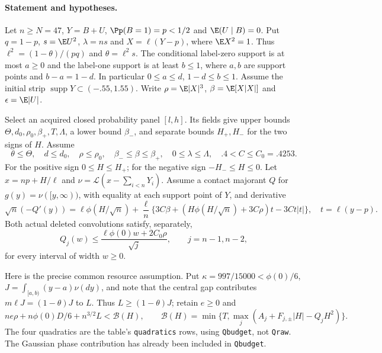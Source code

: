 \paragraph{Statement and hypotheses.}
Let $n\ge N=47$, $Y=B+U$, $\Pp(B=1)=p<1/2$ and $\E(U\mid B)=0$.
Put $q=1-p$, $s=\E U^2$, $\lambda=ns$ and $X=\ell(Y-p)$, where
$\E X^2=1$. Thus $\ell^2=(1-\theta)/(pq)$ and $\theta=\ell^2s$.
The conditional label-zero support is at most $a\ge0$ and the label-one
support is at least $b\le1$, where $a,b$ are support points and
$b-a=1-d$. In particular $0\le a\le d$, $1-d\le b\le1$.
Assume the initial strip $\operatorname{supp}Y\subset(-.55,1.55)$.
Write $\rho=\E|X|^3$, $\beta=\E[X|X|]$ and $\epsilon=\E|U|$.

Select an acquired closed probability panel $[l,h]$.
Its fields give upper bounds $\Theta,d_0,\rho_0,\beta_+,T,\Lambda$,
a lower bound $\beta_-$, and separate bounds $H_+,H_-$ for the two signs of
$H$. Assume
\[
 \theta\le\Theta,\quad d\le d_0,\quad \rho\le\rho_0,
 \quad \beta_-\le\beta\le\beta_+,\quad 0\le\lambda\le\Lambda,
 \quad .4<C\le C_0=.4253.
\]
For the positive sign $0\le H\le H_+$; for the negative sign
$-H_-\le H\le0$. Let $x=np+H/\ell$ and
$\nu=\mathcal L(x-\sum_{i<n}Y_i)$. Assume a contact majorant $Q$ for
$g(y)=\nu([y,\infty))$, with equality at each support point of $Y$,
and derivative
\begin{equation}\label{j:local:conf:derivative}
 \sqrt n(-Q'(y))=\ell\phi(H/\sqrt n)
 +\frac\ell n\{3C\beta+(H\phi(H/\sqrt n)+3C\rho)t-3Ct|t|\},
 \quad t=\ell(y-p).
\end{equation}
Both actual deleted convolutions satisfy, separately,
\begin{equation}\label{j:local:conf:concentration}
 Q_j(w)\le\frac{\ell\phi(0)w+2C_0\rho}{\sqrt j},
 \qquad j=n-1,n-2,
\end{equation}
for every interval of width $w\ge0$.

Here is the precise common resource assumption. Put
$\kappa=997/15000<\phi(0)/6$, $J=\int_{[a,b)}(y-a)\nu(dy)$,
and note that the central gap contributes $m\ell J=(1-\theta)J$ to $L$.
Thus $L\ge(1-\theta)J$; retain $e\ge0$ and
\begin{equation}\label{j:local:conf:budget}
 n e\rho+n\phi(0)D/6+n^{3/2}L<\mathcal B(H),\qquad
 \mathcal B(H)=\min\{T,\max_j(A_j+F_{j,\pm}|H|-Q_jH^2)\}.
\end{equation}
The four quadratics are the table's \texttt{quadratics} rows, using
\texttt{Qbudget}, not \texttt{Qraw}. The Gaussian phase contribution
has already been included in \texttt{Qbudget}.

